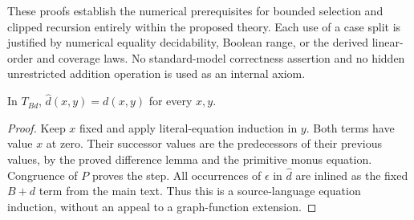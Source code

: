These proofs establish the numerical prerequisites for bounded selection
and clipped recursion entirely within the proposed theory.  Each use of
a case split is justified by numerical equality decidability, Boolean
range, or the derived linear-order and coverage laws.  No standard-model
correctness assertion and no hidden unrestricted addition operation is
used as an internal axiom.

\begin{corollary}
In $T_{Bd}$, $\widehat d(x,y)=d(x,y)$ for every $x,y$.
\end{corollary}
\begin{proof}
Keep $x$ fixed and apply literal-equation induction in $y$.
Both terms have value $x$ at zero. Their successor values are the
predecessors of their previous values, by the proved difference lemma
and the primitive monus equation. Congruence of $P$ proves the step.
All occurrences of $\epsilon$ in $\widehat d$ are inlined as the fixed
$B+d$ term from the main text. Thus this is a source-language equation
induction, without an appeal to a graph-function extension.
\end{proof}

